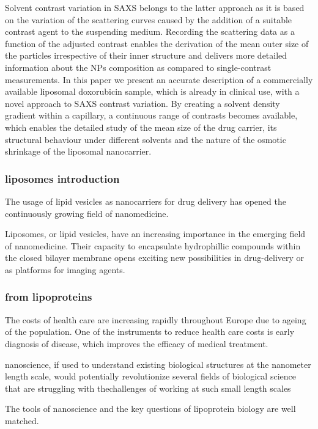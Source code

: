 Solvent contrast variation in SAXS belongs to the latter approach as it is based on the variation of the scattering curves caused by the addition of a suitable contrast agent to the suspending medium. Recording the scattering data as a function of the adjusted contrast enables the derivation of the mean outer size of the particles irrespective of their inner structure and delivers more detailed information about the NPs composition as compared to single-contrast measurements. In this paper we present an accurate description of a commercially available liposomal doxorubicin sample, which is already in clinical use, with a novel approach to SAXS contrast variation. By creating a solvent density gradient within a capillary, a continuous range of contrasts becomes available, which enables the detailed study of the mean size of the drug carrier, its structural behaviour under different solvents and the nature of the osmotic shrinkage of the liposomal nanocarrier.

\subsubsection{liposomes introduction}

The usage of lipid vesicles as nanocarriers for drug delivery has opened the continuously growing field of nanomedicine. 

Liposomes, or lipid vesicles, have an increasing importance in the emerging field of nanomedicine. Their capacity to encapsulate hydrophillic compounds within the closed bilayer membrane opens exciting new possibilities in drug-delivery or as platforms for imaging agents.

\subsubsection{from lipoproteins}

The costs of health care are increasing rapidly throughout Europe due to ageing of the population. One of the instruments to reduce health care costs is early diagnosis of disease, which improves the efficacy of medical treatment.

nanoscience, if used to understand existing biological structures at the nanometer length scale, would potentially revolutionize several fields of biological science that are struggling with thechallenges of working at such small length scales

The tools of nanoscience and the key questions of lipoprotein biology are well matched. 

